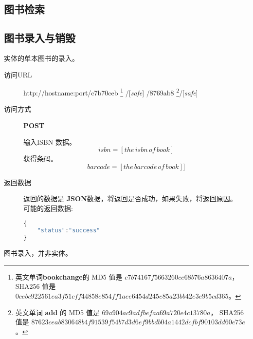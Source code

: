 \documentclass[UTF8]{article}
\def\safe{/[\textit{safe}]}
\def\POST{\colorbox[rgb]{0.77,0.53,0.97}{\textbf{POST}}}
\def\bfJSON{\textbf{JSON}\space}
\def\viaurl{\item[{\quad\colorbox[rgb]{0.47,0.88,0.89}{访问URL}}]}
\def\viareq#1{\item[{\quad\colorbox[rgb]{0.57,0.88,0.99}{访问方式}}] #1}
\def\rtdata{\item[{\quad\colorbox[rgb]{0.70,0.9,0.59}{返回数据}}]}
\begin{document}
        \subsection{图书检索}
        \subsection{图书录入与销毁}
        实体的单本图书的录入。
        \begin{description}
            \viaurl  http://hostname:port/c7b70ceb
            \footnote{
                英文单词\textbf{bookchange}的
                MD5 值是 $c7b74167f5663260ce68b76a8636407a $，
                SHA256 值是 $0cebc922561ea3f51cff44858e854ff1aee6454d245e85a23bb42e3e9b5cd365$。
            }
            \safe
            /8769ab8
            \footnote{
                英文单词 \textbf{add} 的
                MD5 值是 $69a904ac9adfbefaa69a720e4c13780a $，
                SHA256 值是 $87623ceab830648b4f91539f54b7d3d6ef9bbdb04a1442dcfbf90103dd60e73e$。
            }\safe

            \viareq{\POST}

             输入ISBN 数据。
            $$isbn=[the\,isbn\,of\,book]$$
             获得条码。
            $$barcode=[the\,barcode\,of\,book]]$$
            \rtdata 返回的数据是 \bfJSON 数据，将返回是否成功，如果失败，将返回原因。
            \\ 可能的返回数据:
            \begin{lstlisting}[language=JavaScript]
{
    "status":"success"
}
            \end{lstlisting}
        \end{description}
        图书录入，并非实体。
\end{document}
